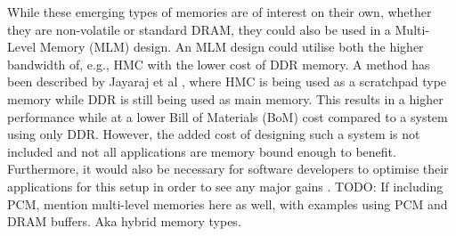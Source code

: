 While these emerging types of memories are of interest on their own, whether they are non-volatile or standard DRAM, they could also be used in a Multi-Level Memory (MLM) design. An MLM design could utilise both the higher bandwidth of, e.g., HMC with the lower cost of DDR memory. A method has been described by Jayaraj et al \cite{Jayaraj:2015:PPM:2818950.2818976}, where HMC is being used as a scratchpad type memory while DDR is still being used as main memory. This results in a higher performance while at a lower Bill of Materials (BoM) cost compared to a system using only DDR. However, the added cost of designing such a system is not included and not all applications are memory bound enough to benefit. Furthermore, it would also be necessary for software developers to optimise their applications for this setup in order to see any major gains \cite{Bender:2015:KCT:2818950.2818977}\cite{BENDER2017213}. TODO: If including PCM, mention multi-level memories here as well, with examples using PCM and DRAM buffers. Aka hybrid memory types.
\bigskip

